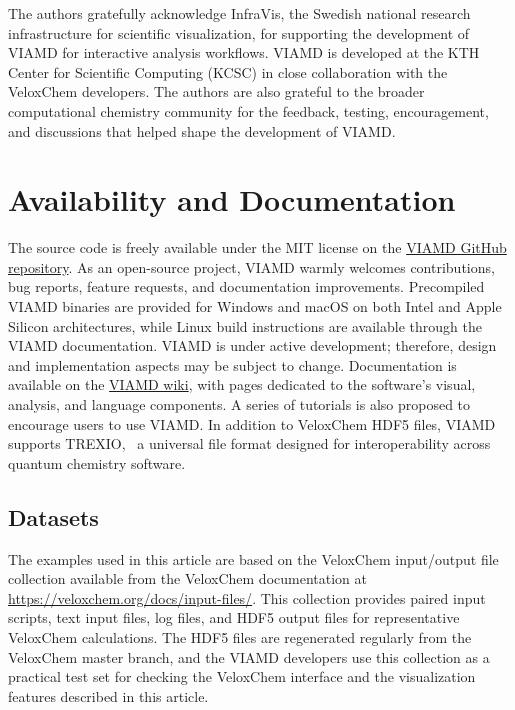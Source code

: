 \documentclass[journal=jacsat,manuscript=article]{achemso}
\begin{document}
\begin{acknowledgement}

The authors gratefully acknowledge InfraVis, the Swedish national research infrastructure for scientific visualization, for supporting the development of VIAMD for interactive analysis workflows. VIAMD is developed at the KTH Center for Scientific Computing (KCSC) in close collaboration with the VeloxChem developers. The authors are also grateful to the broader computational chemistry community for the feedback, testing, encouragement, and discussions that helped shape the development of VIAMD.

\end{acknowledgement}

\section{Availability and Documentation}
The source code is freely available under the MIT license on the \href{https://github.com/scanberg/viamd}{VIAMD GitHub repository}.
As an open-source project, VIAMD warmly welcomes contributions, bug reports, feature requests, and documentation improvements.
Precompiled VIAMD binaries are provided for Windows and macOS on both Intel and Apple Silicon architectures, while Linux build instructions are available through the VIAMD documentation.
VIAMD is under active development; therefore, design and implementation aspects may be subject to change. Documentation is available on the \href{https://github.com/scanberg/viamd/wiki}{VIAMD wiki}, with pages dedicated to the software's visual, analysis, and language components. A series of tutorials is also proposed to encourage users to use VIAMD. In addition to VeloxChem HDF5 files, VIAMD supports TREXIO,~\cite{Trexio} a universal file format designed for interoperability across quantum chemistry software.

\subsection{Datasets}
The examples used in this article are based on the VeloxChem input/output file collection available from the VeloxChem documentation at \href{https://veloxchem.org/docs/input-files/}{https://veloxchem.org/docs/input-files/}. This collection provides paired input scripts, text input files, log files, and HDF5 output files for representative VeloxChem calculations. The HDF5 files are regenerated regularly from the VeloxChem master branch, and the VIAMD developers use this collection as a practical test set for checking the VeloxChem interface and the visualization features described in this article.
\end{document}
